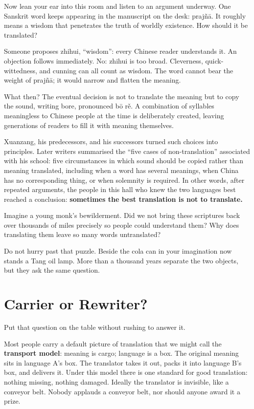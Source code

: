 Now lean your ear into this room and listen to an argument underway. One Sanskrit word keeps appearing in the manuscript on the desk: prajñā. It roughly means a wisdom that penetrates the truth of worldly existence. How should it be translated?

Someone proposes zhihui, ``wisdom'': every Chinese reader understands it. An objection follows immediately. No: zhihui is too broad. Cleverness, quick-wittedness, and cunning can all count as wisdom. The word cannot bear the weight of prajñā; it would narrow and flatten the meaning.

What then? The eventual decision is not to translate the meaning but to copy the sound, writing bore, pronounced bō rě. A combination of syllables meaningless to Chinese people at the time is deliberately created, leaving generations of readers to fill it with meaning themselves.

Xuanzang, his predecessors, and his successors turned such choices into principles. Later writers summarised the ``five cases of non-translation'' associated with his school: five circumstances in which sound should be copied rather than meaning translated, including when a word has several meanings, when China has no corresponding thing, or when solemnity is required. In other words, after repeated arguments, the people in this hall who knew the two languages best reached a conclusion: \textbf{sometimes the best translation is not to translate.}

Imagine a young monk's bewilderment. Did we not bring these scriptures back over thousands of miles precisely so people could understand them? Why does translating them leave so many words untranslated?

Do not hurry past that puzzle. Beside the cola can in your imagination now stands a Tang oil lamp. More than a thousand years separate the two objects, but they ask the same question.

\section{Carrier or Rewriter?}
Put that question on the table without rushing to answer it.

Most people carry a default picture of translation that we might call the \textbf{transport model}: meaning is cargo; language is a box. The original meaning sits in language A's box. The translator takes it out, packs it into language B's box, and delivers it. Under this model there is one standard for good translation: nothing missing, nothing damaged. Ideally the translator is invisible, like a conveyor belt. Nobody applauds a conveyor belt, nor should anyone award it a prize.

